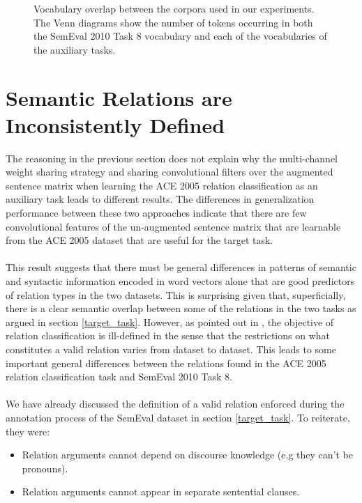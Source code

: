 \newpage
\thispagestyle{empty}
\begin{figure}
	\centering
	
	
	
	\caption{Vocabulary overlap between the corpora used in our experiments. The Venn diagrams show the number of tokens occurring in both the SemEval 2010 Task 8 vocabulary and each of the vocabularies of the auxiliary tasks.}
	\label{vocab_overlap}
\end{figure}
\FloatBarrier

\section{Semantic Relations are Inconsistently Defined}
The reasoning in the previous section does not explain why the multi-channel weight sharing strategy and sharing convolutional filters over the augmented sentence matrix when learning the ACE 2005 relation classification as an auxiliary task leads to different results. The differences in generalization performance between these two approaches indicate that there are few convolutional features of the un-augmented sentence matrix that are learnable from the ACE 2005 dataset that are useful for the target task.
\\\\
This result suggests that there must be general differences in patterns of semantic and syntactic information encoded in word vectors alone that are good predictors of relation types in the two datasets. This is surprising given that, superficially, there is a clear semantic overlap between some of the relations in the two tasks as argued in section \ref{target_task}. However, as pointed out in \citet{handschuh2016}, the objective of relation classification is ill-defined in the sense that the restrictions on what constitutes a valid relation varies from dataset to dataset. This leads to some important general differences between the relations found in the ACE 2005 relation classification task and SemEval 2010 Task 8.
\\\\
We have already discussed the definition of a valid relation enforced during the annotation process of the SemEval dataset in section \ref{target_task}. To reiterate, they were:
\begin{itemize}
	\item Relation arguments cannot depend on discourse knowledge (e.g they can't be pronouns).
	\item Relation arguments cannot appear in separate sentential clauses.
\end{itemize}
